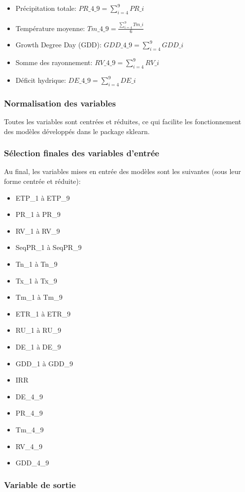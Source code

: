 \documentclass[a4paper,french,11pt]{article}
\begin{document}
\begin{itemize}
\item Précipitation totale: $PR\_4\_9 = \sum_{i =4}^{9}PR\_i$
\item Température moyenne: $Tm\_4\_9 = \frac{\sum_{i =4}^{9}Tm\_i}{6}$
\item Growth Degree Day (GDD): $GDD\_4\_9 = \sum_{i =4}^{9}GDD\_i$
\item Somme des rayonnement: $RV\_4\_9 = \sum_{i =4}^{9}RV\_i$
\item Déficit hydrique: $DE\_4\_9 = \sum_{i =4}^{9}DE\_i$
\end{itemize}
\subsubsection*{Normalisation des variables}

Toutes les variables sont centrées et réduites, ce qui facilite les fonctionnement des modèles développés dans le package sklearn.

\subsubsection*{Sélection finales des variables d'entrée}

Au final, les variables mises en entrée des modèles sont les suivantes (sous leur forme centrée et réduite):
\begin{itemize}
\item ETP\_1 à ETP\_9
\item PR\_1 à PR\_9
\item RV\_1 à RV\_9
\item SeqPR\_1 à SeqPR\_9
\item Tn\_1 à Tn\_9
\item Tx\_1 à Tx\_9
\item Tm\_1 à Tm\_9
\item ETR\_1 à ETR\_9
\item RU\_1 à RU\_9
\item DE\_1 à DE\_9
\item GDD\_1 à GDD\_9
\item IRR
\item DE\_4\_9
\item PR\_4\_9
\item Tm\_4\_9
\item RV\_4\_9
\item GDD\_4\_9
\end{itemize}


\subsubsection*{Variable de sortie}
\end{document}

